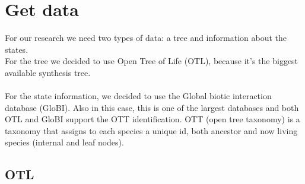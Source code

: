  \section{Get data}
  For our research we need two types of data: a tree and information about the states. \\
  For the tree we decided to use Open Tree of Life (OTL), because it's the biggest available synthesis 
    tree. \\
   \\
  For the state information, we decided to use the Global biotic interaction database (GloBI). Also in 
    this case, this is one of the largest databases and both OTL and GloBI support the OTT 
    identification. OTT (open tree taxonomy) is a taxonomy that assigns to each species a unique id, 
    both ancestor and now living species (internal and leaf nodes).

    \subsection{OTL}

